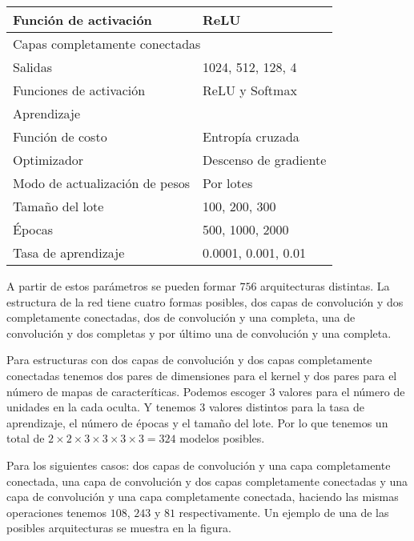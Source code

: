 \begin{table}[]
\begin{tabular}{|l|l|}
Función de activación    & ReLU                                                                                                                                        \\ \hline
\multicolumn{2}{|l|}{Capas completamente conectadas}                                                                                                                   \\ \hline
Salidas                  & 1024, 512, 128, 4                                                                                                                               \\ \hline
Funciones de activación  & ReLU y Softmax                                                                                                                              \\ \hline
\multicolumn{2}{|l|}{Aprendizaje}                                                                                                                                      \\ \hline
Función de costo         & Entropía cruzada                                                                                                                            \\ \hline
Optimizador              & Descenso de gradiente                                                                                                                       \\ \hline
Modo de actualización de pesos & Por lotes
\\ \hline
Tamaño del lote & 100, 200, 300
\\ \hline
Épocas & 500, 1000, 2000
\\ \hline
Tasa de aprendizaje & 0.0001, 0.001, 0.01
\\ \hline
\end{tabular}

\end{table}

A partir de estos parámetros se pueden formar $756$ arquitecturas distintas. 
La estructura de la red tiene cuatro formas posibles, dos capas de convolución
y dos completamente conectadas, dos de convolución y una completa, una de convolución
y dos completas y por último una de convolución y una completa. 

Para estructuras con dos capas de convolución y dos capas completamente conectadas 
tenemos dos
pares de dimensiones para el kernel y dos pares para el número de mapas de 
caracteríticas. Podemos escoger $3$ valores para el número de unidades 
en la cada oculta. Y tenemos $3$ valores distintos para la tasa de aprendizaje, 
el número de épocas y el tamaño del lote. Por lo que tenemos un total
de $2 \times 2 \times 3 \times 3 \times 3 \times 3 = 324$ modelos posibles. 

Para los siguientes casos: dos capas de convolución y una capa completamente conectada, una capa de convolución y dos capas completamente conectadas y
una capa de convolución y una capa completamente conectada, haciendo las
mismas operaciones tenemos $108$, $243$ y $81$ respectivamente.
Un ejemplo de una de las posibles arquitecturas se muestra en la figura.

%
